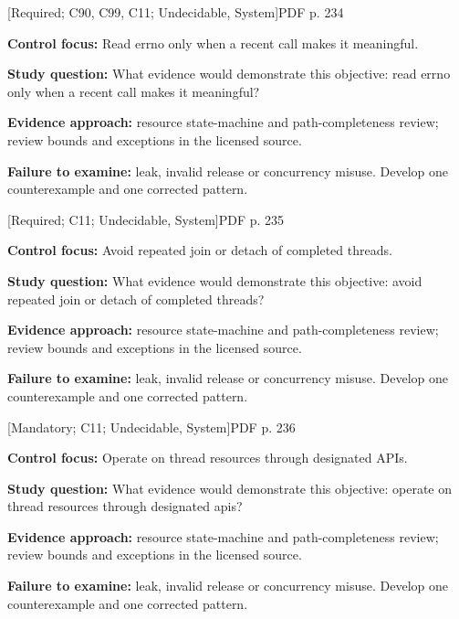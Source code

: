 \documentclass[10pt,letterpaper]{article}
\begin{document}
 \textsf{\footnotesize [Required; C90, C99, C11; Undecidable, System]}\hfill{\footnotesize PDF p. 234}\par
\textbf{Control focus:} Read errno only when a recent call makes it meaningful.\par
\textbf{Study question:} What evidence would demonstrate this objective: read errno only when a recent call makes it meaningful?\par
\textbf{Evidence approach:} resource state-machine and path-completeness review; review bounds and exceptions in the licensed source.\par
\textbf{Failure to examine:} leak, invalid release or concurrency misuse. Develop one counterexample and one corrected pattern.\par
\smallskip
{}
 \textsf{\footnotesize [Required; C11; Undecidable, System]}\hfill{\footnotesize PDF p. 235}\par
\textbf{Control focus:} Avoid repeated join or detach of completed threads.\par
\textbf{Study question:} What evidence would demonstrate this objective: avoid repeated join or detach of completed threads?\par
\textbf{Evidence approach:} resource state-machine and path-completeness review; review bounds and exceptions in the licensed source.\par
\textbf{Failure to examine:} leak, invalid release or concurrency misuse. Develop one counterexample and one corrected pattern.\par
\smallskip
{}
 \textsf{\footnotesize [Mandatory; C11; Undecidable, System]}\hfill{\footnotesize PDF p. 236}\par
\textbf{Control focus:} Operate on thread resources through designated APIs.\par
\textbf{Study question:} What evidence would demonstrate this objective: operate on thread resources through designated apis?\par
\textbf{Evidence approach:} resource state-machine and path-completeness review; review bounds and exceptions in the licensed source.\par
\textbf{Failure to examine:} leak, invalid release or concurrency misuse. Develop one counterexample and one corrected pattern.\par
\smallskip
{}
\end{document}
